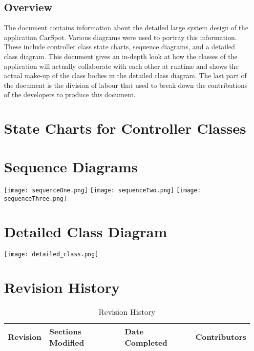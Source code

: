 \documentclass[12pt]{article}
\begin{document}
\subsection{Overview}
\label{sub:overview}
The document contains information about the detailed large system design of the application CarSpot. Various diagrams were used to portray this information. These include controller class state charts, sequence diagrams, and a detailed class diagram. This document gives an in-depth look at how the classes of the application will actually collaborate with each other at runtime and shows the actual make-up of the class bodies in the detailed class diagram. The last part of the document is the division of labour that used to break down the contributions of the developers to produce this document.


\section{State Charts for Controller Classes}

\section{Sequence Diagrams}
\texttt{[image: sequenceOne.png]}
\texttt{[image: sequenceTwo.png]}
\texttt{[image: sequenceThree.png]}

\section{Detailed Class Diagram}
\texttt{[image: detailed\_class.png]}

\newpage

\FloatBarrier
\appendix
\section{Revision History}
\begin{table}[ht]
	\centering
	\begin{tabular}{|p{2cm}|p{5cm}|p{3cm}|p{3cm}|}
		\hline
		\textbf{Revision} & \textbf{Sections Modified} & \textbf{Date Completed} & \textbf{Contributors}\\
		\hline
	\end{tabular}
	\caption{Revision History}
	\label{table:1}
\end{table}
\end{document}
